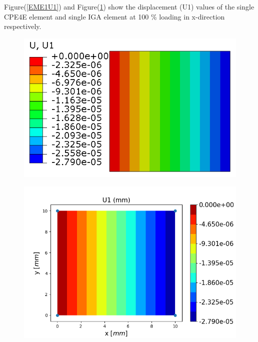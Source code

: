 \documentclass[12pt]{article}
\begin{document}
Figure(\ref{EME1U1}) and Figure(\ref{EME1U1_IGA}) show the displacement (U1) values of the single CPE4E element and single IGA element at 100 \% loading in x-direction respectively. \\
\begin{figure}[H]
	\centering
	\begin{minipage}{.5\textwidth}
		\centering
		\includegraphics[width=1\linewidth]{EME1U1.png}
		\label{EME1U1}
	\end{minipage}%
	\begin{minipage}{.55\textwidth}
		\centering
		\includegraphics[width=1\linewidth]{EME1U1_IGA.png}
		\label{EME1U1_IGA}
	\end{minipage}
\end{figure}
\end{document}
